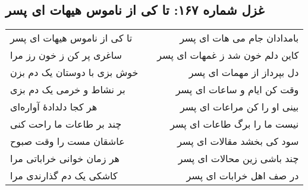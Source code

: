 \begin{center}
\section*{غزل شماره ۱۶۷: تا کی از ناموس هیهات ای پسر}
\label{sec:167}
\begin{longtable}{l p{0.5cm} r}
تا کی از ناموس هیهات ای پسر
&&
بامدادان جام می هات ای پسر
\\
ساغری پر کن ز خون رز مرا
&&
کاین دلم خون شد ز غمهات ای پسر
\\
خوش بزی با دوستان یک دم بزن
&&
دل بپرداز از مهمات ای پسر
\\
بر نشاط و خرمی یک دم بزی
&&
وقت کن ایام و ساعات ای پسر
\\
هر کجا دلدادهٔ آواره‌ای
&&
بینی او را کن مراعات ای پسر
\\
چند بر طاعات ما راحت کنی
&&
نیست ما را برگ طاعات ای پسر
\\
عاشقان مست را وقت صبوح
&&
سود کی بخشد مقالات ای پسر
\\
هر زمان خوانی خراباتی مرا
&&
چند باشی زین محالات ای پسر
\\
کاشکی یک دم گذارندی مرا
&&
در صف اهل خرابات ای پسر
\\
\end{longtable}
\end{center}
